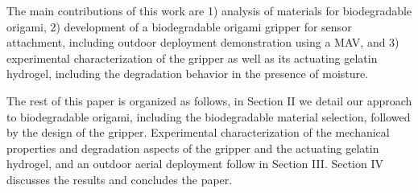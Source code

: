 The main contributions of this work are 1) analysis of materials for biodegradable origami, 2) development of a biodegradable origami gripper for sensor attachment, including outdoor deployment demonstration using a MAV, and 3) experimental characterization of the gripper as well as its actuating gelatin hydrogel, including the degradation behavior in the presence of moisture.

The rest of this paper is organized as follows, in Section II we detail our approach to biodegradable origami, including the biodegradable material selection, followed by the design of the gripper. Experimental characterization of the mechanical properties and degradation aspects of the gripper and the actuating gelatin hydrogel, and an outdoor aerial deployment follow in Section III. Section IV discusses the results and concludes the paper.



